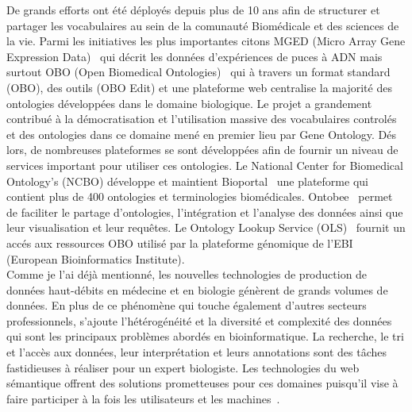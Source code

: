 De grands efforts ont été déployés depuis plus de 10 ans afin de structurer et partager les vocabulaires au sein de la comunauté Biomédicale et des sciences de la vie. Parmi les initiatives les plus importantes citons MGED (Micro Array Gene Expression Data)~\cite{Whetzel2006} qui décrit les données d’expériences de puces à ADN mais surtout OBO (Open Biomedical Ontologies)~\cite{Smith2007,Golbreich2007,Tirmizi2011} qui à travers un format standard (OBO), des outils (OBO Edit) et une plateforme web centralise la majorité des ontologies développées dans le domaine biologique. Le projet a grandement contribué à la démocratisation et l'utilisation massive des vocabulaires controlés et des ontologies dans ce domaine mené en premier lieu par Gene Ontology. Dés lors, de nombreuses plateformes se sont développées afin de fournir un niveau de services important pour utiliser ces ontologies.  Le National Center for Biomedical Ontology’s (NCBO) développe et maintient Bioportal~\cite{Noy2009} une plateforme qui contient plus de 400 ontologies et terminologies biomédicales. Ontobee~\cite{Ong2016} permet de faciliter le partage d’ontologies, l’intégration et l’analyse des données ainsi que leur visualisation et leur requêtes. Le Ontology Lookup Service (OLS)~\cite{Cote2006} fournit un accés aux ressources OBO utilisé par la plateforme génomique de l'EBI (European Bioinformatics Institute).\\

Comme je l'ai déjà mentionné, les nouvelles technologies de production de données haut-débits en médecine et en biologie génèrent de grands volumes de données. En plus de ce phénomène qui touche également d'autres secteurs professionnels, s'ajoute l’hétérogénéité et la diversité et complexité des données qui sont les principaux problèmes abordés en bioinformatique. La recherche, le tri et l’accès aux données, leur interprétation et leurs annotations sont des tâches fastidieuses à réaliser pour un expert biologiste.  Les technologies du web sémantique offrent des solutions prometteuses pour ces domaines puisqu'il vise à faire participer à la fois les utilisateurs et les machines~\cite{berners2001semweb}.\\

